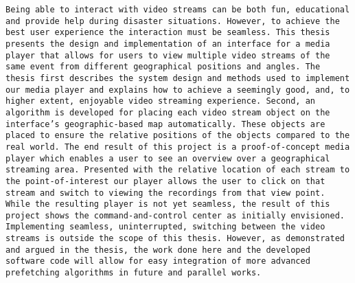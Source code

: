 \texttt{Being able to interact with video streams can be both fun, educational and provide help during disaster situations. However, to achieve the best user experience the interaction must be seamless. This thesis presents the design and implementation of an interface for a media player that allows for users to view multiple video streams of the same event from different geographical positions and angles. The thesis first describes the system design and methods used to implement our media player and explains how to achieve a seemingly good, and, to higher extent, enjoyable video streaming experience. Second, an algorithm is developed for placing each video stream object on the interface's geographic-based map automatically. These objects are placed to ensure the relative positions of the objects compared to the real world. The end result of this project is a proof-of-concept media player which enables a user to see an overview over a geographical streaming area. Presented with the relative location of each stream to the point-of-interest our player allows the user to click on that stream and switch to viewing the recordings from that view point. While the resulting player is not yet seamless, the result of this project shows the command-and-control center as initially envisioned. Implementing seamless, uninterrupted, switching between the video streams is outside the scope of this thesis. However, as demonstrated and argued in the thesis, the work done here and the developed software code will allow for easy integration of more advanced prefetching algorithms in future and parallel works.}